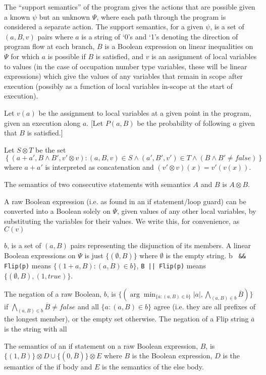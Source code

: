 \documentclass{article}
\begin{document}
The ``support semantics'' of the program gives the actions that are possible given a known $\psi$ but an unknown $\Psi$, where each path through the program is considered a separate action. The support semantics, for a given $\psi$, is a set of $(a,B,v)$ pairs where $a$ is a string of `0's and `1's denoting the direction of program flow at each branch, $B$ is a Boolean expression on linear inequalities on $\Psi$ for which $a$ is possible if $B$ is satisfied, and $v$ is an assignment of local variables to values (in the case of occupation number type variables, these will be linear expressions) which give the values of any variables that remain in scope after execution (possibly as a function of local variables in-scope at the start of execution).

Let $v(a)$ be the assignment to local variables at a given point in the program, given an execution along $a$. [Let $P(a,B)$ be the probability of following $a$ given that $B$ is satisfied.]

Let $S \otimes T$ be the set $\left\{(a+a',B\wedge B', v' \otimes v) : (a,B,v)\in S \wedge (a',B',v')\in T\wedge (B\wedge B' \ne false)\right\}$ where $a + a'$ is interpreted as concatenation and $(v'\otimes v)(x) = v'(v(x))$. 

The semantics of two consecutive statements with semantics $A$ and $B$ is $A\otimes B$.

A raw Boolean expression (i.e. as found in an if statement/loop guard) can be converted into a Boolean solely on $\Psi$, given values of any other local variables, by substituting the variables for their values. We write this, for convenience, as $C(v)$

 $b$, is a set of $(a,B)$ pairs representing the disjunction of its members. A linear Boolean expressions on $\Psi$ is just $\{(\emptyset,B)\}$ where $\emptyset$ is the empty string. b \texttt{ \&\& Flip(p)} means $\{(1+a,B) : (a,B)\in b \}$, \texttt{B || Flip(p)} means $\{(\emptyset,B),(1,true)\}$.

The negation of a raw Boolean, $b$, is $\{(\arg\min_{\{\overline{a}:(a,B)\in b\}}|a|,\bigwedge_{(a,B)\in b} \overline{B})\}$ if $\bigwedge_{(a,B)\in b} \overline{B} \ne false$ and all $\{a:(a,B)\in b\}$ agree (i.e. they are all prefixes of the longest member), or the empty set otherwise. The negation of a Flip string $\overline{a}$ is the string with all 

The semantics of an if statement on a raw Boolean expression, $B$, is $\{(1,B)\}\otimes D \cup \{(0,\overline{B})\}\otimes E $ where $B$ is the Boolean expression, $D$ is the semantics of the if body and $E$ is the semantics of the else body.
 
\end{document}

